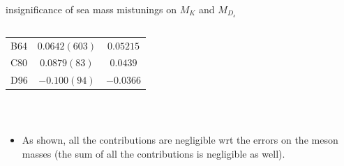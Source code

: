 \documentclass[xcolor={dvipsnames,table}]{beamer}
\begin{document}
\begin{frame}{insignificance of sea mass mistunings on $M_K$ and $M_{D_s}$}
\begin{columns}
\begin{column}{0.5\textwidth}
\begin{center}
\begin{tabular}{l|c|c}
          B64 & $0.0642(603)$                        & $0.05215$ \\
          C80 & $0.0879(83)$                         & $0.0439$  \\
          D96 & $-0.100(94)$                         & $-0.0366$ \\
        \end{tabular}
      \end{center}
    \end{column}
  \end{columns}
  \vspace*{0.1cm}\,
  \begin{itemize}
    \item As shown, all the contributions are negligible wrt the errors on the meson masses (the sum of all the contributions is negligible as well).
  \end{itemize}
\end{frame}
\end{document}
